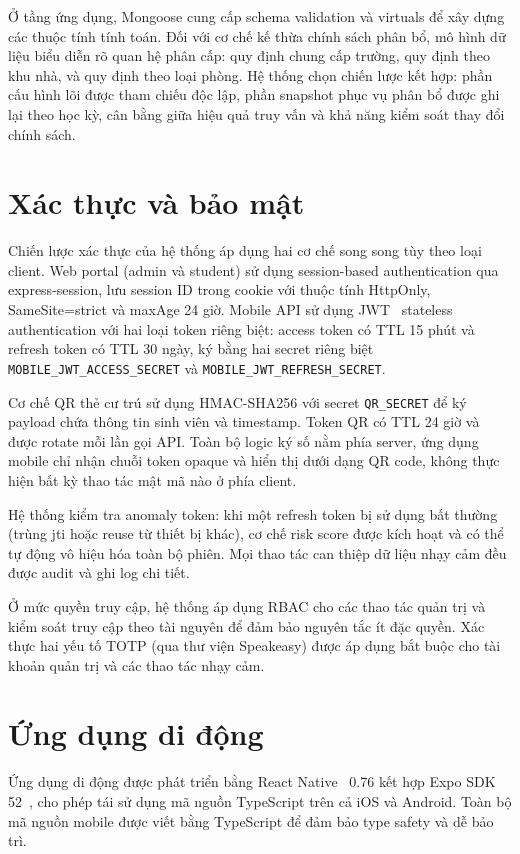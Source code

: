 ﻿\documentclass[a4paper,12pt,openany,oneside]{report}
\begin{document}
Ở tầng ứng dụng, Mongoose cung cấp schema validation và virtuals để xây dựng các thuộc tính tính toán. Đối với cơ chế kế thừa chính sách phân bổ, mô hình dữ liệu biểu diễn rõ quan hệ phân cấp: quy định chung cấp trường, quy định theo khu nhà, và quy định theo loại phòng. Hệ thống chọn chiến lược kết hợp: phần cấu hình lõi được tham chiếu độc lập, phần snapshot phục vụ phân bổ được ghi lại theo học kỳ, cân bằng giữa hiệu quả truy vấn và khả năng kiểm soát thay đổi chính sách.

\section{Xác thực và bảo mật}

Chiến lược xác thực của hệ thống áp dụng hai cơ chế song song tùy theo loại
client. Web portal (admin và student) sử dụng session-based authentication qua
express-session, lưu session ID trong cookie với thuộc tính HttpOnly,
SameSite=strict và maxAge 24 giờ. Mobile API sử dụng JWT~\cite{rfc7519} stateless authentication với hai loại
token riêng biệt: access token có TTL 15 phút và refresh token có TTL 30 ngày,
ký bằng hai secret riêng biệt \texttt{MOBILE\_JWT\_ACCESS\_SECRET} và
\texttt{MOBILE\_JWT\_REFRESH\_SECRET}.

Cơ chế QR thẻ cư trú sử dụng HMAC-SHA256 với secret \texttt{QR\_SECRET} để ký
payload chứa thông tin sinh viên và timestamp. Token QR có TTL 24 giờ và được
rotate mỗi lần gọi API. Toàn bộ logic ký số nằm phía server, ứng dụng mobile
chỉ nhận chuỗi token opaque và hiển thị dưới dạng QR code, không thực hiện bất
kỳ thao tác mật mã nào ở phía client.

Hệ thống kiểm tra anomaly token: khi một refresh token bị sử dụng bất thường
(trùng jti hoặc reuse từ thiết bị khác), cơ chế risk score được kích hoạt và
có thể tự động vô hiệu hóa toàn bộ phiên. Mọi thao tác can thiệp dữ liệu nhạy
cảm đều được audit và ghi log chi tiết.

Ở mức quyền truy cập, hệ thống áp dụng RBAC cho các thao tác quản trị và kiểm
soát truy cập theo tài nguyên để đảm bảo nguyên tắc ít đặc quyền. Xác thực hai
yếu tố TOTP (qua thư viện Speakeasy) được áp dụng bắt buộc cho tài khoản quản
trị và các thao tác nhạy cảm.

\section{Ứng dụng di động}

Ứng dụng di động được phát triển bằng React Native~\cite{reactnative2024} 0.76
kết hợp Expo SDK 52~\cite{expo2024router}, cho phép tái sử dụng mã nguồn
TypeScript trên cả iOS và Android. Toàn bộ mã
nguồn mobile được viết bằng TypeScript để đảm bảo type safety và dễ bảo trì.
\end{document}

